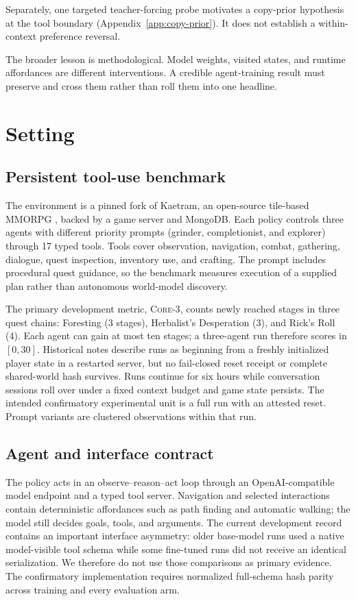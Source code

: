 \documentclass[11pt,a4paper]{article}
\newcommand{\core}{\textsc{Core-3}}
\begin{document}
Separately, one targeted teacher-forcing probe motivates a copy-prior
hypothesis at the tool boundary (Appendix~\ref{app:copy-prior}). It does not
establish a within-context preference reversal.

The broader lesson is methodological. Model weights, visited states, and
runtime affordances are different interventions. A credible agent-training
result must preserve and cross them rather than roll them into one headline.

\section{Setting}

\subsection{Persistent tool-use benchmark}

The environment is a pinned fork of Kaetram, an open-source tile-based MMORPG
\citep{kaetram2026}, backed by a game server and MongoDB. Each policy controls
three agents with different priority
prompts (grinder, completionist, and explorer) through 17 typed tools. Tools
cover observation, navigation, combat, gathering, dialogue, quest inspection,
inventory use, and crafting. The prompt includes procedural quest guidance, so
the benchmark measures execution of a supplied plan rather than autonomous
world-model discovery.

The primary development metric, \core{}, counts newly reached stages in three
quest chains: Foresting (3 stages), Herbalist's Desperation (3), and Rick's Roll
(4). Each agent can gain at most ten stages; a three-agent run therefore scores
in $[0,30]$. Historical notes describe runs as beginning from a freshly
initialized player state in a restarted server, but no fail-closed reset receipt
or complete shared-world hash survives. Runs continue for six hours while
conversation sessions roll over under a fixed context budget and game state
persists. The intended confirmatory experimental unit is a full run with an
attested reset. Prompt variants are clustered observations within that run.

\subsection{Agent and interface contract}

The policy acts in an observe--reason--act loop through an OpenAI-compatible
model endpoint and a typed tool server. Navigation and selected interactions
contain deterministic affordances such as path finding and automatic walking;
the model still decides goals, tools, and arguments. The current development
record contains an important interface asymmetry: older base-model runs used a
native model-visible tool schema while some fine-tuned runs did not receive an
identical serialization. We therefore do not use those comparisons as primary
evidence. The confirmatory implementation requires normalized full-schema hash
parity across training and every evaluation arm.
\end{document}
